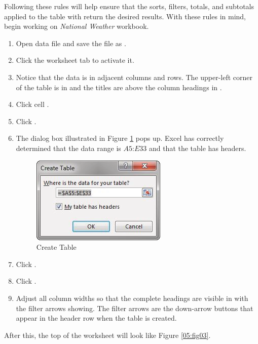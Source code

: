 Following these rules will help ensure that the sorts, filters, totals, and subtotals applied to the table with return the desired results. With these rules in mind, begin working on \textit{National Weather} workbook. 

\begin{enumbox}
	\begin{enumerate}
		\item Open data file  and save the file as .
		\item Click the  worksheet tab to activate it.
		\item Notice that the data is in adjacent columns and rows. The upper-left corner of the table is in  and the titles are above the column headings in .
		\item Click cell .
		\item Click .
		\item The dialog box illustrated in Figure \ref{05:fig02} pops up. Excel has correctly determined that the data range is $ A5 $:$ E33 $ and that the table has headers.

		\begin{figure}[H]
			\centering
			\includegraphics[width=\maxwidth{.95\linewidth}]{gfx/ch05_fig02}
			\caption{Create Table}
			\label{05:fig02}
		\end{figure}

		\item Click .
		\item Click .
		\item Adjust all column widths so that the complete headings are visible in  with the filter arrows showing. The filter arrows are the down-arrow buttons that appear in the header row when the table is created. 
	\end{enumerate}
\end{enumbox}
	
After this, the top of the worksheet will look like Figure \ref{05:fig03}.

